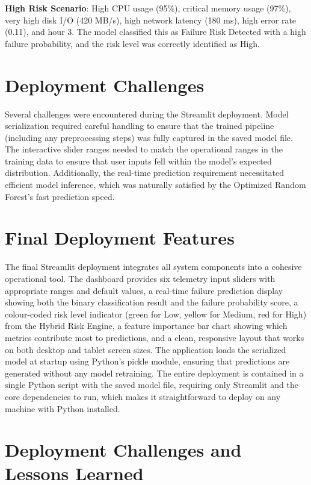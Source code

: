 \documentclass[12pt,letterpaper]{report}
\begin{document}
\textbf{High Risk Scenario}: High CPU usage (95\%), critical memory usage (97\%), very high disk I/O (420 MB/s), high network latency (180 ms), high error rate (0.11), and hour 3. The model classified this as Failure Risk Detected with a high failure probability, and the risk level was correctly identified as High.

\section{Deployment Challenges}

Several challenges were encountered during the Streamlit deployment. Model serialization required careful handling to ensure that the trained pipeline (including any preprocessing steps) was fully captured in the saved model file. The interactive slider ranges needed to match the operational ranges in the training data to ensure that user inputs fell within the model's expected distribution. Additionally, the real-time prediction requirement necessitated efficient model inference, which was naturally satisfied by the Optimized Random Forest's fast prediction speed.

\section{Final Deployment Features}

The final Streamlit deployment integrates all system components into a cohesive operational tool. The dashboard provides six telemetry input sliders with appropriate ranges and default values, a real-time failure prediction display showing both the binary classification result and the failure probability score, a colour-coded risk level indicator (green for Low, yellow for Medium, red for High) from the Hybrid Risk Engine, a feature importance bar chart showing which metrics contribute most to predictions, and a clean, responsive layout that works on both desktop and tablet screen sizes. The application loads the serialized model at startup using Python's pickle module, ensuring that predictions are generated without any model retraining. The entire deployment is contained in a single Python script with the saved model file, requiring only Streamlit and the core dependencies to run, which makes it straightforward to deploy on any machine with Python installed.

\section{Deployment Challenges and Lessons Learned}
\end{document}

